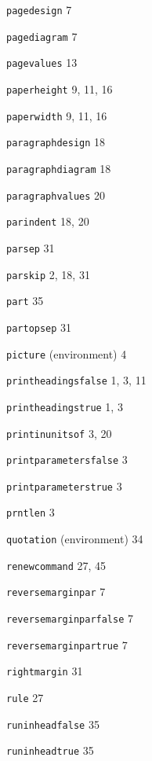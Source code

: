 \documentclass[11pt]{article}
\providecommand{\indexfill}{}
\providecommand{\alphaindexspace}[1]{\indexspace{\bfseries #1}}
\begin{document}
\begin{theindex}
\alphaindexspace{P}


\item \texttt  {\bs pagedesign}  \indexfill
   7
\item \texttt  {\bs pagediagram}  \indexfill
   7
\item \texttt  {\bs pagevalues}  \indexfill
   13
\item \texttt  {\bs paperheight}  \indexfill
   9, 11, 16
\item \texttt  {\bs paperwidth}  \indexfill
   9, 11, 16
\item \texttt  {\bs paragraphdesign}  \indexfill
   18
\item \texttt  {\bs paragraphdiagram}  \indexfill
   18
\item \texttt  {\bs paragraphvalues}  \indexfill
   20
\item \texttt  {\bs parindent}  \indexfill
   18, 20
\item \texttt  {\bs parsep}  \indexfill
   31
\item \texttt  {\bs parskip}  \indexfill
   2, 18, 31
\item \texttt  {\bs part}  \indexfill
   35
\item \texttt  {\bs partopsep}  \indexfill
   31
\item \texttt  {picture} (environment)  \indexfill
   4
\item \texttt  {\bs printheadingsfalse}  \indexfill
   1, 3, 11
\item \texttt  {\bs printheadingstrue}  \indexfill
   1, 3
\item \texttt  {\bs printinunitsof}  \indexfill
   3, 20
\item \texttt  {\bs printparametersfalse}  \indexfill
   3
\item \texttt  {\bs printparameterstrue}  \indexfill
   3
\item \texttt  {\bs prntlen}  \indexfill
   3

\alphaindexspace{Q}


\item \texttt  {quotation} (environment)  \indexfill
   34

\alphaindexspace{R}


\item \texttt  {\bs renewcommand}  \indexfill
   27, 45
\item \texttt  {\bs reversemarginpar}  \indexfill
   7
\item \texttt  {\bs reversemarginparfalse}  \indexfill
   7
\item \texttt  {\bs reversemarginpartrue}  \indexfill
   7
\item \texttt  {\bs rightmargin}  \indexfill
   31
\item \texttt  {\bs rule}  \indexfill
   27
\item \texttt  {\bs runinheadfalse}  \indexfill
   35
\item \texttt  {\bs runinheadtrue}  \indexfill
   35


\end{theindex}
\end{document}

